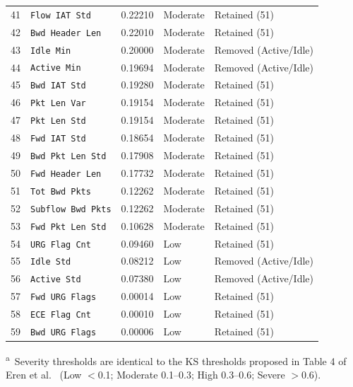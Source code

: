 \documentclass[a4paper,fleqn]{cas-sc}
\begin{document}
\begin{longtable}{@{}r l r l l@{}}
41 & \texttt{Flow IAT Std}      & 0.22210 & Moderate & Retained (51) \\
42 & \texttt{Bwd Header Len}    & 0.22010 & Moderate & Retained (51) \\
43 & \texttt{Idle Min}          & 0.20000 & Moderate & Removed (Active/Idle) \\
44 & \texttt{Active Min}        & 0.19694 & Moderate & Removed (Active/Idle) \\
45 & \texttt{Bwd IAT Std}       & 0.19280 & Moderate & Retained (51) \\
46 & \texttt{Pkt Len Var}       & 0.19154 & Moderate & Retained (51) \\
47 & \texttt{Pkt Len Std}       & 0.19154 & Moderate & Retained (51) \\
48 & \texttt{Fwd IAT Std}       & 0.18654 & Moderate & Retained (51) \\
49 & \texttt{Bwd Pkt Len Std}   & 0.17908 & Moderate & Retained (51) \\
50 & \texttt{Fwd Header Len}    & 0.17732 & Moderate & Retained (51) \\
51 & \texttt{Tot Bwd Pkts}      & 0.12262 & Moderate & Retained (51) \\
52 & \texttt{Subflow Bwd Pkts}  & 0.12262 & Moderate & Retained (51) \\
53 & \texttt{Fwd Pkt Len Std}   & 0.10628 & Moderate & Retained (51) \\
54 & \texttt{URG Flag Cnt}      & 0.09460 & Low      & Retained (51) \\
55 & \texttt{Idle Std}          & 0.08212 & Low      & Removed (Active/Idle) \\
56 & \texttt{Active Std}        & 0.07380 & Low      & Removed (Active/Idle) \\
57 & \texttt{Fwd URG Flags}     & 0.00014 & Low      & Retained (51) \\
58 & \texttt{ECE Flag Cnt}      & 0.00010 & Low      & Retained (51) \\
59 & \texttt{Bwd URG Flags}     & 0.00006 & Low      & Retained (51) \\
\end{longtable}
\endgroup

\vspace{-0.5\baselineskip}
\noindent\footnotesize\textsuperscript{a}~Severity thresholds are identical to the KS thresholds proposed in Table 4 of Eren et al.~\cite{Eren2026} (Low $<$0.1; Moderate 0.1--0.3; High 0.3--0.6; Severe $>$0.6).
\normalsize
\end{document}
